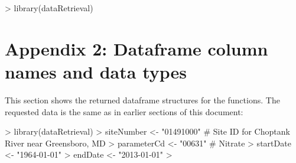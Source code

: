 \documentclass[a4paper,11pt]{article}
\begin{document}
\begin{Schunk}
\begin{Sinput}
> library(dataRetrieval)
\end{Sinput}
\end{Schunk}

\newpage
\section{Appendix 2: Dataframe column names and data types}
This section shows the returned dataframe structures for the functions.  The requested data is the same as in earlier sections of this document:
\begin{Schunk}
\begin{Sinput}
> library(dataRetrieval)
> siteNumber <- "01491000" # Site ID for Choptank River near Greensboro, MD
> parameterCd <- "00631"  # Nitrate
> startDate <- "1964-01-01"
> endDate <- "2013-01-01"
> 
\end{Sinput}
\end{Schunk}

\end{document}
